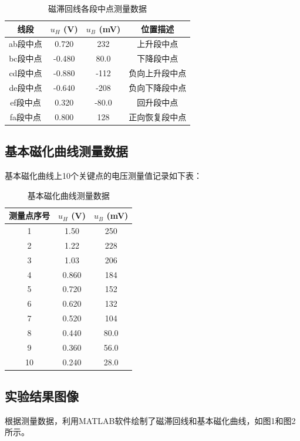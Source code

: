 ﻿\documentclass[12pt,a4paper]{article}
\begin{document}
\begin{table}[H]
\centering
\caption{磁滞回线各段中点测量数据}
\begin{tabular}{|c|c|c|c|}
\hline
线段 & $u_H$ (V) & $u_B$ (mV) & 位置描述 \\
\hline
ab段中点 & 0.720 & 232 & 上升段中点 \\
\hline
bc段中点 & -0.480 & 80.0 & 下降段中点 \\
\hline
cd段中点 & -0.880 & -112 & 负向上升段中点 \\
\hline
de段中点 & -0.640 & -208 & 负向下降段中点 \\
\hline
ef段中点 & 0.320 & -80.0 & 回升段中点 \\
\hline
fa段中点 & 0.800 & 128 & 正向恢复段中点 \\
\hline
\end{tabular}
\end{table}

\subsection{基本磁化曲线测量数据}

基本磁化曲线上10个关键点的电压测量值记录如下表：

\begin{table}[H]
\centering
\caption{基本磁化曲线测量数据}
\begin{tabular}{|c|c|c|}
\hline
测量点序号 & $u_H$ (V) & $u_B$ (mV) \\
\hline
1 & 1.50 & 250 \\
\hline
2 & 1.22 & 228 \\
\hline
3 & 1.03 & 206 \\
\hline
4 & 0.860 & 184 \\
\hline
5 & 0.720 & 152 \\
\hline
6 & 0.620 & 132 \\
\hline
7 & 0.520 & 104 \\
\hline
8 & 0.440 & 80.0 \\
\hline
9 & 0.360 & 56.0 \\
\hline
10 & 0.240 & 28.0 \\
\hline
\end{tabular}
\end{table}

\subsection{实验结果图像}

根据测量数据，利用MATLAB软件绘制了磁滞回线和基本磁化曲线，如图1和图2所示。
\end{document}
